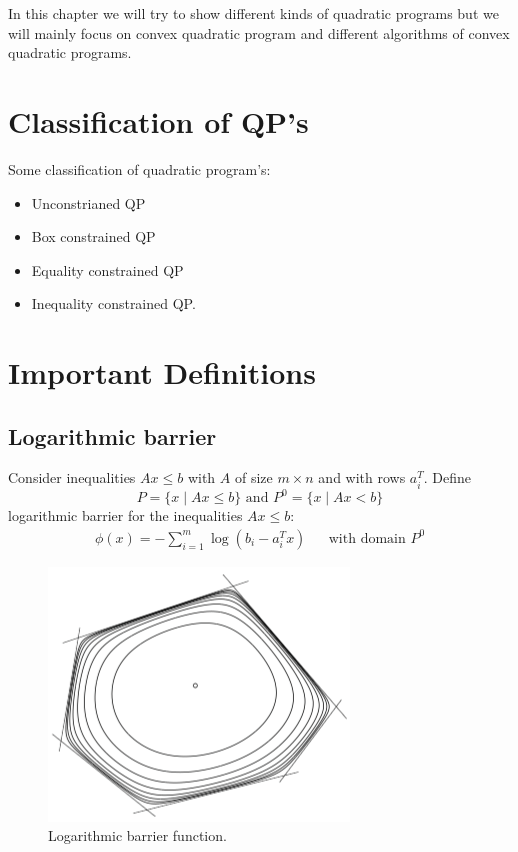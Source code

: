 In this chapter we will try to show different kinds of quadratic programs but we will mainly focus on convex quadratic program and different algorithms of convex quadratic programs.

\section{Classification of QP's}

Some classification of quadratic program's:
\begin{itemize}
	\item Unconstrianed QP
	\item Box constrained QP
	\item Equality constrained QP
	\item Inequality constrained QP.
\end{itemize}

\section*{Important Definitions}
\subsection*{Logarithmic barrier}
Consider inequalities $Ax \leqslant b$ with $A$ of size $m\times n$ and with rows $a_i^T$. Define
\begin{equation*}
P=\lbrace x \mid Ax \leqslant b \rbrace \text{ and } P^0=\lbrace x \mid Ax < b \rbrace
\end{equation*}
logarithmic barrier for the inequalities $Ax\leqslant b$:
\begin{equation*}
\begin{aligned}
	\phi(x) = - \sum_{i=1}^{m}\log(b_i - a_i^Tx) & & \text{with domain } P^0
\end{aligned}	
\end{equation*}
\begin{figure}[h]
\centering
\includegraphics[scale=0.5]{Figures/logarithmic_barrier.png}
\decoRule
\caption[hypercube]{Logarithmic barrier function.}
\label{fig:logarithmic_barrier}
\end{figure}


